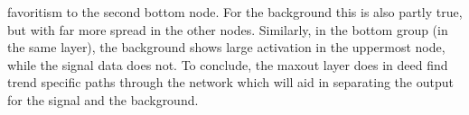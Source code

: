 favoritism to the second bottom node. For the background this is also partly true, but with far more 
spread in the other nodes. Similarly, in the bottom group (in the same layer), the background shows large
activation in the uppermost node, while the signal data does not. To conclude, the maxout layer does in deed 
find trend specific paths through the network which will aid in separating the output for the signal and the background.\\
\begin{figure}
\end{figure}
